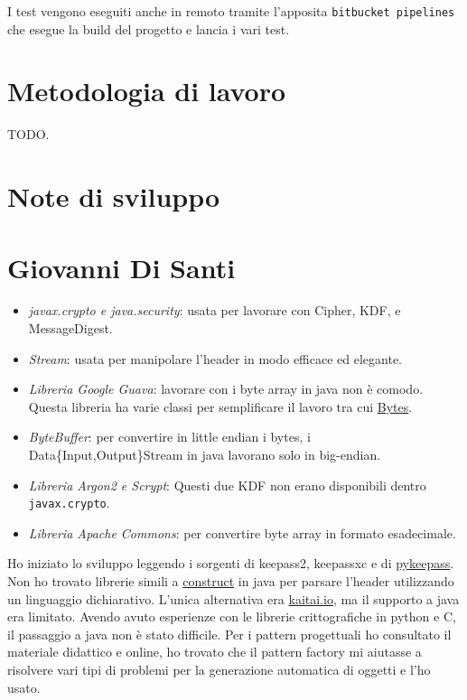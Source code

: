 \documentclass[a4paper,12pt]{report}
\begin{document}
I test vengono eseguiti anche in remoto tramite l'apposita \texttt{bitbucket pipelines} che
esegue la build del progetto e lancia i vari test.

\section{Metodologia di lavoro}

TODO.

\section{Note di sviluppo}

\section*{Giovanni Di Santi}

\begin{itemize}
  \item \textit{javax.crypto e java.security}: usata per lavorare con Cipher, KDF, e MessageDigest.
  \item \textit{Stream}: usata per manipolare l'header in modo efficace ed elegante.
  \item \textit{Libreria Google Guava}: lavorare con i byte array in java non è comodo. Questa libreria ha varie classi per semplificare
    il lavoro tra cui \href{https://guava.dev/releases/19.0/api/docs/com/google/common/primitives/Bytes.html}{Bytes}.
  \item \textit{ByteBuffer}: per convertire in little endian i bytes, i Data\{Input,Output\}Stream in java lavorano solo in big-endian.
  \item \textit{Libreria Argon2 e Scrypt}: Questi due KDF non erano disponibili dentro \texttt{javax.crypto}.
  \item \textit{Libreria Apache Commons}: per convertire byte array in formato esadecimale.
\end{itemize}

Ho iniziato lo sviluppo leggendo i sorgenti di keepass2, keepassxc e di \href{https://github.com/libkeepass/pykeepass}{pykeepass}.
Non ho trovato librerie simili a \href{https://construct.readthedocs.io/en/latest/index.html}{construct} in
java per parsare l'header utilizzando un linguaggio dichiarativo. L'unica alternativa
era \href{http://kaitai.io/}{kaitai.io}, ma il supporto a java era limitato.
Avendo avuto esperienze con le librerie crittografiche in python e C,
il passaggio a java non è stato difficile.
Per i pattern progettuali ho consultato il materiale didattico e online, ho trovato
che il pattern factory mi aiutasse a risolvere vari tipi di problemi per la generazione
automatica di oggetti e l'ho usato.
\end{document}
